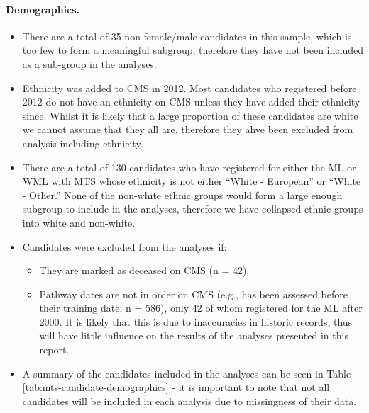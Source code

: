 \documentclass[
  12pt,
  a4paper,
]{book}
\providecommand{\tightlist}{%
  \setlength{\itemsep}{0pt}\setlength{\parskip}{0pt}}
\begin{document}
\hypertarget{mts-part-a-demographics}{%
\paragraph{Demographics.}\label{mts-part-a-demographics}}

\begin{itemize}
\tightlist
\item
  There are a total of 35 non female/male candidates in this sample, which is too few to form a meaningful subgroup, therefore they have not been included as a sub-group in the analyses.
\item
  Ethnicity was added to CMS in 2012. Most candidates who registered before 2012 do not have an ethnicity on CMS unless they have added their ethnicity since. Whilst it is likely that a large proportion of these candidates are white we cannot assume that they all are, therefore they ahve been excluded from analysis including ethnicity.
\item
  There are a total of 130 candidates who have registered for either the ML or WML with MTS whose ethnicity is not either ``White - European'' or ``White - Other.'' None of the non-white ethnic groups would form a large enough subgroup to include in the analyses, therefore we have collapsed ethnic groups into white and non-white.
\item
  Candidates were excluded from the analyses if:

  \begin{itemize}
  \tightlist
  \item
    They are marked as deceased on CMS (n = 42).
  \item
    Pathway dates are not in order on CMS (e.g., has been assessed before their training date; n = 586), only 42 of whom registered for the ML after 2000. It is likely that this is due to inaccuracies in historic records, thus will have little influence on the results of the analyses presented in this report.
  \end{itemize}
\item
  A summary of the candidates included in the analyses can be seen in Table \ref{tab:mts-candidate-demographics} - it is important to note that not all candidates will be included in each analysis due to missingness of their data.
\end{itemize}
\end{document}
